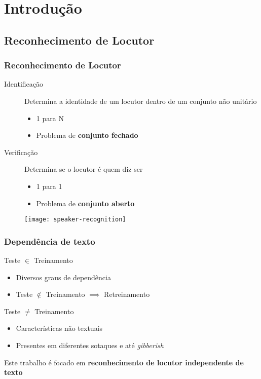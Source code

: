 \section{Introdução}
\label{sec:intro}

\contentscurrent

\subsection{Reconhecimento de Locutor}

\begin{frame}
\frametitle{Reconhecimento de Locutor}
\begin{description}
    \item[Identificação] Determina a identidade de um locutor dentro de um conjunto não unitário
    \pause
    \begin{itemize}
        \item 1 para N
        \item Problema de \textbf{conjunto fechado}
        \pause
    \end{itemize}
    \item[Verificação] Determina se o locutor é quem diz ser
    \pause
    \begin{itemize}
        \item 1 para 1
        \item Problema de \textbf{conjunto aberto}
        \pause
    \end{itemize}
\end{description}

\begin{figure}
    \centering
    \texttt{[image: speaker-recognition]}
\end{figure}
\end{frame}

\begin{frame}
\frametitle{Dependência de texto}
\begin{description}
    \item[Com] Teste $\in$ Treinamento
    \pause
    \begin{itemize}
        \item Diversos graus de dependência
        \item Teste $\not\in$ Treinamento $\implies$ Retreinamento
        \pause
    \end{itemize}
    \item[Sem] Teste $\neq$ Treinamento
    \pause
    \begin{itemize}
        \item Características não textuais
        \item Presentes em diferentes sotaques e até \emph{gibberish}
        \pause
    \end{itemize}
    \item Este trabalho é focado em \textbf{reconhecimento de locutor independente de texto}
\end{description}
\end{frame}

